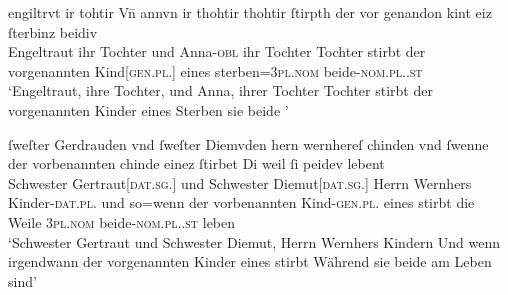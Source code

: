 \begin{exe}
\ex \label{ex:cao_beidiu_neutfem}
	\begin{xlist}
	\ex \label{ex:cao_beidiu_neutfem_1}
		\gll engiltrvt ir tohtir Vn̄ annvn ir thohtir thohtir
			\textelp{} ſtirpth der {vor genandon} kint eiz \textelp{}
			ſterbinz {beidiv \textelp{}} \\
			Engeltraut ihr Tochter und Anna-\textsc{obl} ihr Tochter Tochter {}
			stirbt der vorgenannten Kind[\textsc{gen.pl.\NeutF}] eines {}
			sterben=\textsc{3pl\subF.nom} beide-\textsc{nom.pl.\NeutF.st} \\
		\trans `Engeltraut, ihre Tochter, und Anna, ihrer Tochter Tochter
			\textelp{} stirbt der vorgenannten Kinder eines \textelp{}
			Sterben sie beide \textelp{}'
			\parencites(Nr. 629, St.~Gallen, 1284)[57,24--25]{cao2}


	\ex \label{ex:cao_beidiu_neutfem_3}
		\gll ſweſter Gerdrauden vnd ſweſter Diemvden hern wernhereſ
			chinden \textelp{} vnd ſwenne der vorbenannten chinde
			einez ſtirbet \textelp{} Di weil ſi peidev
			lebent \\
			Schwester Gertraut[\textsc{dat.sg.\FemF}] und Schwester
			Diemut[\textsc{dat.sg.\FemF}] Herrn Wernhers Kinder-\textsc{dat.pl.\NeutF} {}
			und so=wenn der vorbenannten Kind-\textsc{gen.pl.\NeutF} eines stirbt
			{} die Weile \textsc{3pl\subF.nom} beide-\textsc{nom.pl.\NeutF.st} leben \\
		\trans `Schwester Gertraut und Schwester Diemut, Herrn Wernhers
			Kindern \textelp{} Und wenn irgendwann der vorgenannten Kinder eines
			stirbt \textelp{} Während sie beide am Leben sind'
			\parencites(Nr.~2960, Engelthal, Kr.~Nürnberger Land, 1298)[240,31--38]{cao4}
	\end{xlist}
\end{exe}

